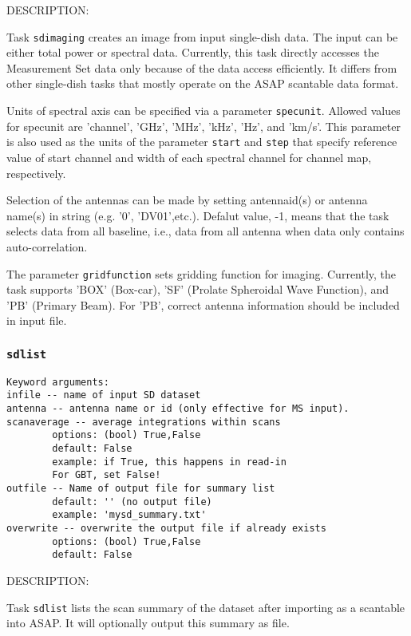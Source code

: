 DESCRIPTION:

Task {\tt sdimaging} creates an image from input single-dish data.
The input can be either total power or spectral data. Currently,
this task directly accesses the Measurement Set data only because of 
the data access efficiently. It differs from other single-dish tasks 
that mostly operate on the ASAP scantable data format.
 
Units of spectral axis can be specified via a parameter {\tt specunit}.
Allowed values for specunit are 'channel', 'GHz', 'MHz', 'kHz', 'Hz', 
and 'km/s'. This parameter is also used as the units of the parameter 
{\tt start} and {\tt step} that specify reference value of start channel and width 
of each spectral channel for channel map, respectively.

Selection of the antennas can be made by setting antennaid(s) or 
antenna name(s) in string (e.g. '0', 'DV01',etc.). Defalut value, -1, means 
that the task selects data from all baseline, i.e., data from all antenna when 
data only contains auto-correlation.

The parameter {\tt gridfunction} sets gridding function for imaging. 
Currently, the task supports 'BOX' (Box-car), 'SF' (Prolate Spheroidal 
Wave Function), and 'PB' (Primary Beam). For 'PB', correct antenna 
information should be included in input file. 

%
 

\subsubsection{{\tt sdlist}}
\label{section:sd.sdtasks.tasks.sdlist}

\begin{verbatim}
Keyword arguments:
infile -- name of input SD dataset
antenna -- antenna name or id (only effective for MS input). 
scanaverage -- average integrations within scans
        options: (bool) True,False
        default: False
        example: if True, this happens in read-in
        For GBT, set False!
outfile -- Name of output file for summary list
        default: '' (no output file)
        example: 'mysd_summary.txt'
overwrite -- overwrite the output file if already exists
        options: (bool) True,False
        default: False
\end{verbatim}
    
DESCRIPTION:
    
Task {\tt sdlist} lists the scan summary of the dataset after importing
as a scantable into ASAP.  It will optionally output this summary
as file.
    

